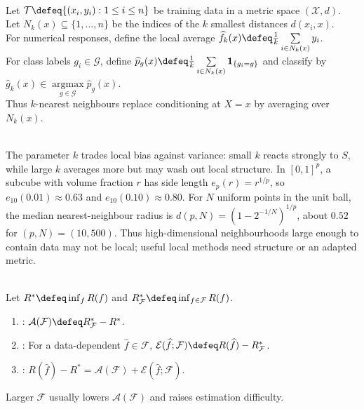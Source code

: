 \begin{method} \label{meth:sl-nearest-neighbor-local-averaging} \\
Let $\mathcal{T}\defeq\{(x_i,y_i):1\leq i\leq n\}$ be training data in a metric space $(\mathcal{X},d)$.\\
Let $N_k(x)\subseteq\{1,\ldots,n\}$ be the indices of the $k$ smallest distances $d(x_i,x)$.\\
For numerical responses, define the local average $\widehat{f}_k(x)\defeq \frac{1}{k}\sum\limits_{i\in N_k(x)}y_i$.\\
For class labels $g_i\in\mathcal{G}$, define $\widehat{p}_g(x)\defeq \frac{1}{k}\sum\limits_{i\in N_k(x)}\mathbf{1}_{\{g_i=g\}}$ and classify by $\widehat{g}_k(x)\in\operatorname*{argmax}\limits_{g\in\mathcal{G}}\widehat{p}_g(x)$.\\
Thus $k$-nearest neighbours replace conditioning at $X=x$ by averaging over $N_k(x)$.
\end{method}

\begin{remark} \label{rem:sl-nearest-neighbors-dimensionality} \\
The parameter $k$ trades local bias against variance: small $k$ reacts strongly to $S$, while large $k$ averages more but may wash out local structure.
In $[0,1]^p$, a subcube with volume fraction $r$ has side length $e_p(r)=r^{1/p}$, so $e_{10}(0.01)\approx0.63$ and $e_{10}(0.10)\approx0.80$.
For $N$ uniform points in the unit ball, the median nearest-neighbour radius is $d(p,N)=(1-2^{-1/N})^{1/p}$, about $0.52$ for $(p,N)=(10,500)$.
Thus high-dimensional neighbourhoods large enough to contain data may not be local; useful local methods need structure or an adapted metric.
\end{remark}

\begin{definition} \label{def:sl-approximation-estimation-tradeoff} \\
Let $R^*\defeq\inf_fR(f)$ and $R_{\mathcal{F}}^*\defeq\inf_{f\in\mathcal{F}}R(f)$.
\begin{enumerate}[label=(\roman*)]
\setlength{\itemsep}{0pt}
\item {}: $\mathcal{A}(\mathcal{F})\defeq R_{\mathcal{F}}^*-R^*$.
\item {}: For a data-dependent $\widehat{f}\in\mathcal{F}$, $\mathcal{E}(\widehat{f};\mathcal{F})\defeq R(\widehat{f})-R_{\mathcal{F}}^*$.
\item {}: $R(\widehat{f})-R^*=\mathcal{A}(\mathcal{F})+\mathcal{E}(\widehat{f};\mathcal{F})$.
\end{enumerate}
Larger $\mathcal{F}$ usually lowers $\mathcal{A}(\mathcal{F})$ and raises estimation difficulty.
\end{definition}

